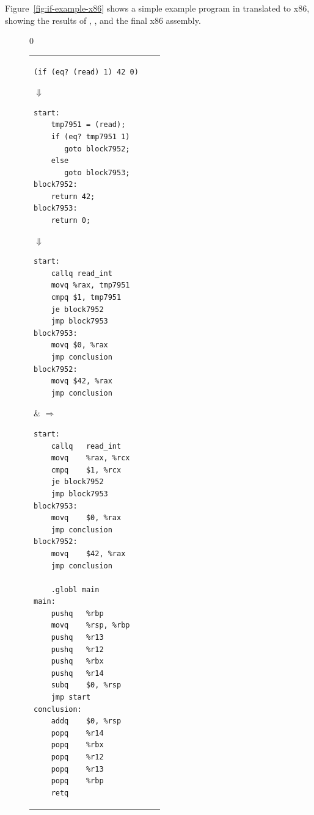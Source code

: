 \documentclass[7x10]{TimesAPriori_MIT}%
\def\racketEd{0}
\def\edition{1}
\numberwithin{theorem}{chapter}
\numberwithin{definition}{chapter}
\numberwithin{equation}{chapter}
\begin{document}
Figure~\ref{fig:if-example-x86} shows a simple example program in
\LangIf{} translated to x86, showing the results of
, , and the final
x86 assembly.

\begin{figure}[tbp]
  \begin{tcolorbox}[colback=white]
    {\if\edition\racketEd
\begin{tabular}{lll}
\begin{minipage}{0.4\textwidth}
\begin{lstlisting}
(if (eq? (read) 1) 42 0)
\end{lstlisting}
$\Downarrow$
\begin{lstlisting}
start:
    tmp7951 = (read);
    if (eq? tmp7951 1)
       goto block7952;
    else
       goto block7953;
block7952:
    return 42;
block7953:
    return 0;
\end{lstlisting}
$\Downarrow$
\begin{lstlisting}
start:
    callq read_int
    movq %rax, tmp7951
    cmpq $1, tmp7951
    je block7952
    jmp block7953
block7953:
    movq $0, %rax
    jmp conclusion
block7952:
    movq $42, %rax
    jmp conclusion
\end{lstlisting}
\end{minipage}
&
$\Rightarrow\qquad$
\begin{minipage}{0.4\textwidth}
\begin{lstlisting}
start:
	callq	read_int
	movq	%rax, %rcx
	cmpq	$1, %rcx
	je block7952
	jmp block7953
block7953:
	movq	$0, %rax
	jmp conclusion
block7952:
	movq	$42, %rax
	jmp conclusion

	.globl main
main:
	pushq	%rbp
	movq	%rsp, %rbp
	pushq	%r13
	pushq	%r12
	pushq	%rbx
	pushq	%r14
	subq	$0, %rsp
	jmp start
conclusion:
	addq	$0, %rsp
	popq	%r14
	popq	%rbx
	popq	%r12
	popq	%r13
	popq	%rbp
	retq
\end{lstlisting}
\end{minipage}
\end{tabular}
\fi}


\end{tcolorbox}
\end{figure}
\end{document}
